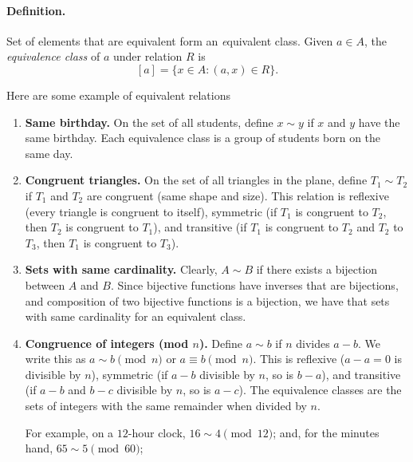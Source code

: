 \paragraph{Definition.} 
Set of elements that are equivalent form an {\emph equivalent class}.  Given $a \in A$, the \emph{equivalence class} of $a$ under relation $R$ is
\[
[a] = \{ x \in A : (a,x)\in R \}.
\]


Here are some example of equivalent relations
\begin{example}
\begin{enumerate}

 \item \textbf{Same birthday.}  
  On the set of all students, define $x \sim y$ if $x$ and $y$ have the same birthday.  
  Each equivalence class is a group of students born on the same day.  
  
  \item \textbf{Congruent triangles.}  
  On the set of all triangles in the plane, define $T_1 \sim T_2$ if $T_1$ and $T_2$ are congruent 
  (same shape and size). This relation is reflexive (every triangle is congruent to itself), 
  symmetric (if $T_1$ is congruent to $T_2$, then $T_2$ is congruent to $T_1$), 
  and transitive (if $T_1$ is congruent to $T_2$ and $T_2$ to $T_3$, then $T_1$ is congruent to $T_3$).  
  

\item \textbf{Sets with same cardinality.}
Clearly, $A \sim B$ if there exists a bijection between $A$ and $B$. Since bijective functions have inverses that are bijections, and composition of two bijective functions is a bijection, we have
that sets with same cardinality for an equivalent class.
  
  \item \textbf{Congruence of integers (mod $n$).}  
  Define $a \sim b$ if $n$ divides $a-b$.  We write this as $a \sim b\pmod{n}$ or $a \equiv b\pmod{n}$.
  This is reflexive ($a-a=0$ is divisible by $n$), symmetric (if $a-b$ divisible by $n$, so is $b-a$), 
  and transitive (if $a-b$ and $b-c$ divisible by $n$, so is $a-c$).  
  The equivalence classes are the sets of integers with the same remainder when divided by $n$.
  
  For example, on a $12$-hour clock, $16\sim 4\pmod{12}$; and, for the minutes hand, $65\sim 5\pmod{60}$;
  
  \begin{center}
\end{center}
\end{enumerate}
\end{example}
